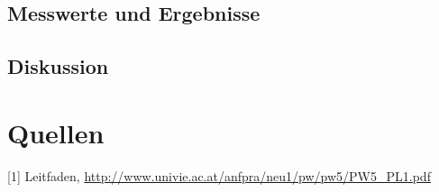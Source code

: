 \documentclass[12pt,a4paper]{article}
\begin{document}
\begin{multicols}{2}
\subsection{Messwerte und Ergebnisse}



\subsection{Diskussion}



\section{Quellen}
[1] Leitfaden, \url{http://www.univie.ac.at/anfpra/neu1/pw/pw5/PW5_PL1.pdf}\\

\end{multicols}
\end{document}
